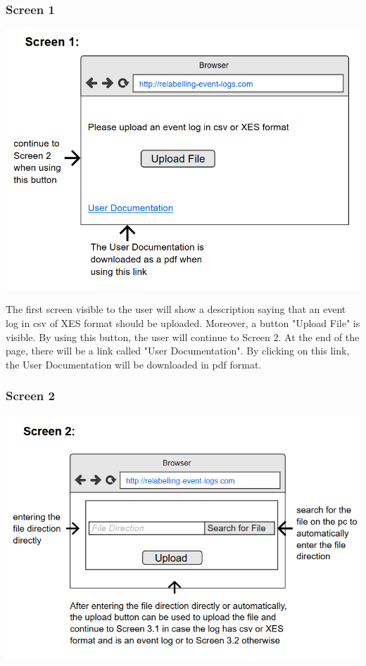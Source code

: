 \documentclass[notitlepage]{article}
\begin{document}
\begin{flushleft}
\subsubsection{Screen 1}

\includegraphics[scale=0.8]{InterfaceMockup1.png}


The first screen visible to the user will show a description saying that an event log in csv of XES format should be uploaded. Moreover, a button "Upload File" is visible. By using this button, the user will continue to Screen 2. At the end of the page, there will be a link called "User Documentation". By clicking on this link, the User Documentation will be downloaded in pdf format.
\subsubsection{Screen 2}

\includegraphics[scale=0.9]{InterfaceMockup2.png}


\end{flushleft}
\end{document}
